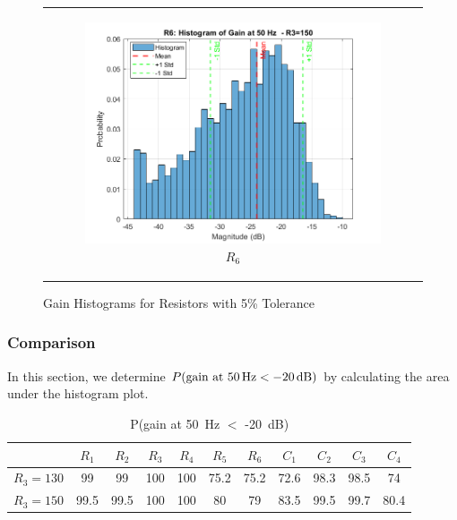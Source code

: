\documentclass[hidelinks,12pt]{article}
\begin{document}
\begin{figure}[!h]
{\begin{tabular}{c}
\begin{subfigure}[h]{0.4\textwidth}
					\includegraphics[width=\textwidth]{figures/r3=150/r6.png}
					\caption{$R_6$}
				\end{subfigure}
			\end{tabular}
		}
		\caption{Gain Histograms for Resistors with 5\% Tolerance}
		\label{fig:R3_150_resistors_5_percent}
	\end{figure}
	
	
	\pagebreak
	
	
	\subsubsection{Comparison}
	In this section, we determine \( P(\text{gain at 50\,Hz} < -20\,\text{dB}) \) by calculating the area under the histogram plot.
	
	\begin{table}[h!]
		\centering
		\begin{tabular}{c|c|c|c|c|c|c|c|c|c|c|}
			\cline{2-11}
			& $R_1$ & $R_2$ & $R_3$ & $R_4$ & $R_5$ & $R_6$ & $C_1$ & $C_2$ & $C_3$ & $C_4$ \\ \hline
			\multicolumn{1}{|c|}{$R_3=130$} & 99    & 99    & 100   & 100   & 75.2  & 75.2    & 72.6  & 98.3    & 98.5    & 74    \\ \hline
			\multicolumn{1}{|c|}{$R_3=150$} & 99.5  & 99.5  & 100   & 100   & 80    & 79    & 83.5  & 99.5    & 99.7  & 80.4  \\ \hline
		\end{tabular}
		\caption{P(gain at 50~Hz $<$ -20~dB)}
		\label{tab:pg50}
	\end{table}
	
\end{document}
